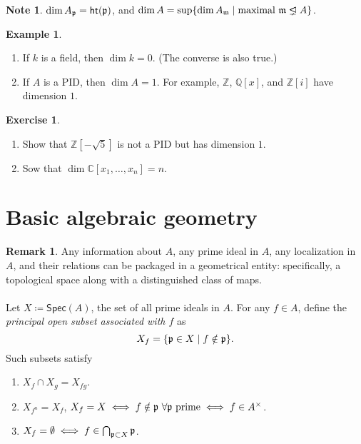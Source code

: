 \documentclass[10pt,letterpaper,cm]{nupset}
\theoremstyle{definition}
\newtheorem{exmp}{Example}
\newtheorem{note}{Note}
\newtheorem{remark}{Remark}
\newtheorem{exercise}{Exercise}
\newcommand{\C}{\mathbb C}
\newcommand{\Q}{\mathbb Q}
\newcommand{\Z}{\mathbb Z}
\newcommand{\1}{\mathbf{1}}
\newcommand{\p}{\frak{p}}
\newcommand{\0}{\vec 0}
\newcommand{\properideal}{%
  \mathrel{\ooalign{$\lneq$\cr\raise.22ex\hbox{$\lhd$}\cr}}}
\begin{document}
\begin{note}
$\dim{A_{\p}} = \mathsf{ht}(\p)$, and $\dim{A} = \sup \{ \dim{A_{\frak{m}}} \mid \text{maximal } \frak{m} \properideal A \}$.
\end{note}

\begin{exmp} $ $
\begin{enumerate}
\item If $k$ is a field, then $\dim{k} =0$. (The converse is also true.)
\item If $A$ is a PID, then $\dim{A} =1$. For example, $\Z$, $\Q[x]$, and $\Z[i]$ have dimension $1$.
\end{enumerate}
\end{exmp}

\begin{exercise} $ $
\begin{enumerate}
\item Show that $\Z[-\sqrt{5}]$ is not a PID but has dimension $1$. 
\item Sow that $\dim{\C[x_1, \ldots, x_n]} =n$. 
\end{enumerate}
\end{exercise}

\section{Basic algebraic geometry}

\begin{remark}
Any information about $A$, any prime ideal in $A$, any localization in $A$, and their relations can be packaged in a geometrical entity: specifically, a topological space along with a distinguished class of maps. 
\\ \\ Let $X\coloneqq  \mathsf{Spec}(A)$, the set of all prime ideals in $A$.  For any $f\in A$, define the \textit{principal open subset associated with $f$} as $$X_f = \{ \p \in X \mid f\notin \p\}.$$  Such subsets satisfy 
\begin{enumerate}[label=(\alph*)]
\item $X_f \cap X_g = X_{fg}$.
\item $X_{f^n} = X_f$, $X_f = X \iff f\notin \p \ \forall \p \text{ prime} \iff f\in A^{\times}$.
\item $X_f = \emptyset \iff f \in \bigcap_{\p \subset X} \p$.
\end{enumerate}
\end{remark}
\end{document}
